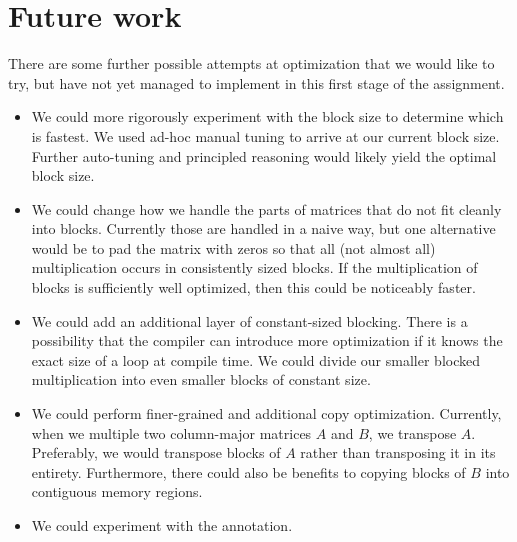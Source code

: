 \section{Future work}\label{sec:future}
There are some further possible attempts at optimization that we would like to
try, but have not yet managed to implement in this first stage of the
assignment.

\begin{itemize}
  \item
    We could more rigorously experiment with the block size to determine which
    is fastest. We used ad-hoc manual tuning to arrive at our current block
    size. Further auto-tuning and principled reasoning would likely yield the
    optimal block size.

  \item
    We could change how we handle the parts of matrices that do not fit cleanly
    into blocks. Currently those are handled in a naive way, but one
    alternative would be to pad the matrix with zeros so that all (not almost
    all) multiplication occurs in consistently sized blocks. If the
    multiplication of blocks is sufficiently well optimized, then this could be
    noticeably faster.

  \item
    We could add an additional layer of constant-sized blocking. There is a
    possibility that the compiler can introduce more optimization if it knows
    the exact size of a loop at compile time. We could divide our smaller
    blocked multiplication into even smaller blocks of constant size.

  \item
    We could perform finer-grained and additional copy optimization. Currently,
    when we multiple two column-major matrices $A$ and $B$, we transpose $A$.
    Preferably, we would transpose blocks of $A$ rather than transposing it in
    its entirety. Furthermore, there could also be benefits to copying blocks
    of $B$ into contiguous memory regions.

  \item
    We could experiment with the  annotation.
\end{itemize}
